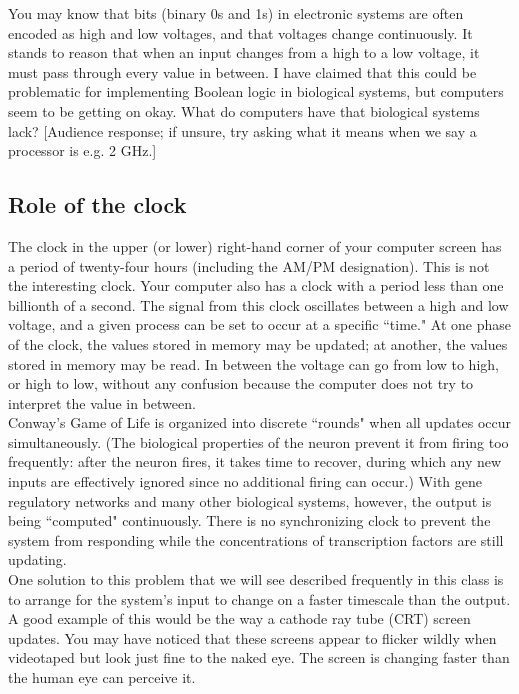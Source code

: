 \documentclass{article}
\begin{document}
You may know that bits (binary 0s and 1s) in electronic systems are often encoded as high and low voltages, and that voltages change continuously. It stands to reason that when an input changes from a high to a low voltage, it must pass through every value in between. I have claimed that this could be problematic for implementing Boolean logic in biological systems, but computers seem to be getting on okay. What do computers have that biological systems lack? [Audience response; if unsure, try asking what it means when we say a processor is e.g. 2 GHz.]

\subsection*{Role of the clock}

The clock in the upper (or lower) right-hand corner of your computer screen has a period of twenty-four hours (including the AM/PM designation). This is not the interesting clock. Your computer also has a clock with a period less than one billionth of a second. The signal from this clock oscillates between a high and low voltage, and a given process can be set to occur at a specific ``time." At one phase of the clock, the values stored in memory may be updated; at another, the values stored in memory may be read. In between the voltage can go from low to high, or high to low, without any confusion because the computer does not try to interpret the value in between.\\

Conway's Game of Life is organized into discrete ``rounds" when all updates occur simultaneously. (The biological properties of the neuron prevent it from firing too frequently: after the neuron fires, it takes time to recover, during which any new inputs are effectively ignored since no additional firing can occur.) With gene regulatory networks and many other biological systems, however, the output is being ``computed"  continuously. There is no synchronizing clock to prevent the system from responding while the concentrations of transcription factors are still updating.\\

One solution to this problem that we will see described frequently in this class is to arrange for the system's input to change on a faster timescale than the output. A good example of this would be the way a cathode ray tube (CRT) screen updates. You may have noticed that these screens appear to flicker wildly when videotaped but look just fine to the naked eye. The screen is changing faster than the human eye can perceive it.\\
\end{document}
